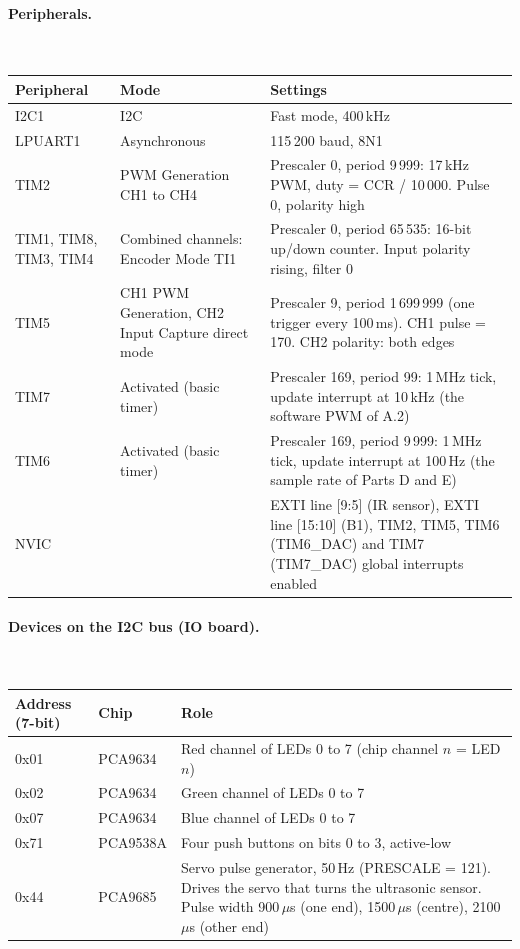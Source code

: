 \documentclass[11pt,a4paper]{article}
\begin{document}
\paragraph{Peripherals.}\leavevmode\\[2pt]
\begin{tabularx}{\textwidth}{@{}l >{\raggedright\arraybackslash}p{4.2cm} L@{}}
\toprule
Peripheral & Mode & Settings \\
\midrule
I2C1 & I2C & Fast mode, 400\,kHz \\
LPUART1 & Asynchronous & 115\,200 baud, 8N1 \\
TIM2 & PWM Generation CH1 to CH4 & Prescaler 0, period 9\,999: 17\,kHz PWM, duty = CCR / 10\,000. Pulse 0, polarity
  high \\
\addlinespace
TIM1, TIM8, TIM3, TIM4 & Combined channels: Encoder Mode TI1 & Prescaler 0, period 65\,535: 16-bit up/down counter.
  Input polarity rising, filter 0 \\
\addlinespace
TIM5 & CH1 PWM Generation, CH2 Input Capture direct mode & Prescaler 9, period 1\,699\,999 (one trigger
  every 100\,ms). CH1 pulse = 170. CH2 polarity: both edges \\
\addlinespace
TIM7 & Activated (basic timer) & Prescaler 169, period 99: 1\,MHz tick, update interrupt at 10\,kHz (the
  software PWM of A.2) \\
\addlinespace
TIM6 & Activated (basic timer) & Prescaler 169, period 9\,999: 1\,MHz tick, update interrupt at 100\,Hz (the sample
  rate of Parts D and E) \\
\addlinespace
NVIC & & EXTI line [9:5] (IR sensor), EXTI line [15:10] (B1), TIM2, TIM5, TIM6 (TIM6\_DAC) and TIM7 (TIM7\_DAC) global interrupts
  enabled \\
\bottomrule
\end{tabularx}

\paragraph{Devices on the I2C bus (IO board).}\leavevmode\\[2pt]
\begin{tabularx}{\textwidth}{@{}l l L@{}}
\toprule
Address (7-bit) & Chip & Role \\
\midrule
0x01 & PCA9634 & Red channel of LEDs 0 to 7 (chip channel $n$ = LED $n$) \\
0x02 & PCA9634 & Green channel of LEDs 0 to 7 \\
0x07 & PCA9634 & Blue channel of LEDs 0 to 7 \\
0x71 & PCA9538A & Four push buttons on bits 0 to 3, active-low \\
0x44 & PCA9685 & Servo pulse generator, 50\,Hz (PRESCALE = 121). Drives the servo that turns the ultrasonic sensor.
  Pulse width 900\,$\mu$s (one end), 1500\,$\mu$s (centre), 2100\,$\mu$s (other end) \\
\bottomrule
\end{tabularx}
\end{document}
